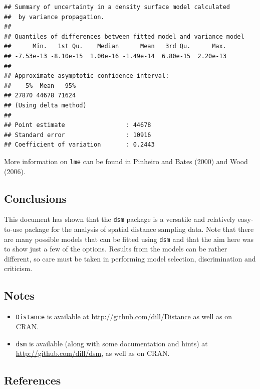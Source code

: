 \documentclass[]{amsart}
\begin{document}
\begin{verbatim}
## Summary of uncertainty in a density surface model calculated
##  by variance propagation.
## 
## Quantiles of differences between fitted model and variance model
##      Min.   1st Qu.    Median      Mean   3rd Qu.      Max. 
## -7.53e-13 -8.10e-15  1.00e-16 -1.49e-14  6.80e-15  2.20e-13 
## 
## Approximate asymptotic confidence interval:
##    5%  Mean   95% 
## 27870 44678 71624 
## (Using delta method)
## 
## Point estimate                 : 44678 
## Standard error                 : 10916 
## Coefficient of variation       : 0.2443
\end{verbatim}

More information on \texttt{lme} can be found in Pinheiro and Bates
(2000) and Wood (2006).

\subsection{Conclusions}

This document has shown that the \texttt{dsm} package is a versatile and
relatively easy-to-use package for the analysis of spatial distance
sampling data. Note that there are many possible models that can be
fitted using \texttt{dsm} and that the aim here was to show just a few
of the options. Results from the models can be rather different, so care
must be taken in performing model selection, discrimination and
criticism.

\subsection{Notes}

\begin{itemize}
\itemsep1pt\parskip0pt
\item
  \texttt{Distance} is available at
  \url{http://github.com/dill/Distance} as well as on CRAN.
\item
  \texttt{dsm} is available (along with some documentation and hints) at
  \url{http://github.com/dill/dsm}, as well as on CRAN.
\end{itemize}

\subsection{References}
\end{document}

